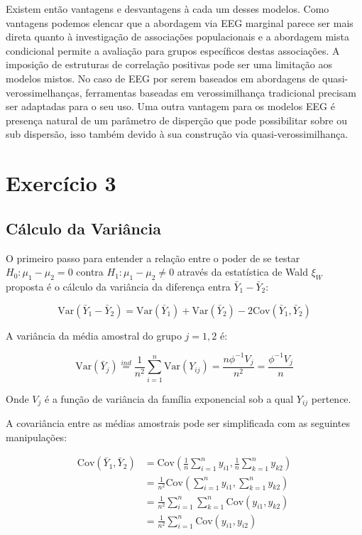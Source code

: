 \documentclass[
  11pt,
]{article}
\begin{document}
Existem então vantagens e desvantagens à cada um desses modelos. Como vantagens podemos elencar que a abordagem via EEG marginal parece ser mais direta quanto à investigação de associações populacionais e a abordagem mista condicional permite a avaliação para grupos específicos destas associações. A imposição de estruturas de correlação positivas pode ser uma limitação aos modelos mistos. No caso de EEG por serem baseados em abordagens de quasi-verossimelhanças, ferramentas baseadas em verossimilhança tradicional precisam ser adaptadas para o seu uso. Uma outra vantagem para os modelos EEG é presença natural de um parâmetro de disperção que pode possibilitar sobre ou sub dispersão, isso também devido à sua construção via quasi-verossimilhança.

\hypertarget{exercuxedcio-3}{%
\section{Exercício 3}\label{exercuxedcio-3}}

\hypertarget{cuxe1lculo-da-variuxe2ncia}{%
\subsection{Cálculo da Variância}\label{cuxe1lculo-da-variuxe2ncia}}

O primeiro passo para entender a relação entre o poder de se testar \(H_0: \mu_1 - \mu_2 = 0\) contra \(H_1: \mu_1 - \mu_2 \ne 0\) através da estatística de Wald \(\xi_W\) proposta é o cálculo da variância da diferença entra \(\bar Y_1 - \bar Y_2\):

\[
\text{Var}(\bar Y_1 - \bar Y_2) =  \text{Var}(\bar Y_1) +  \text{Var}(\bar Y_2) - 2\text{Cov}(\bar Y_1 , \bar Y_2)
\]

A variância da média amostral do grupo \(j=1,2\) é:

\[
\text{Var}(\bar Y_j) \stackrel{ind}{=} \frac{1}{n^2} \sum^{n}_{i=1}{\text{Var}(Y_{ij})} = \frac{n\phi^{-1}V_j}{n^2} = \frac{\phi^{-1}V_j}{n}
\]

Onde \(V_j\) é a função de variância da família exponencial sob a qual \(Y_{ij}\) pertence.

A covariância entre as médias amostrais pode ser simplificada com as seguintes manipulações:

\begin{align*}
\text{Cov}(\bar Y_1 , \bar Y_2) 
&=   \text{Cov} \left( \frac{1}{n} \sum^{n}_{i=1}{y_{i1}} , \frac{1}{n} \sum^{n}_{k=1}{y_{k2}} \right) \\
&=   \frac{1}{n^2} \text{Cov} \left(  \sum^{n}_{i=1}{y_{i1}} , \sum^{n}_{k=1}{y_{k2}} \right) \\
&=   \frac{1}{n^2}  \sum^{n}_{i=1} \sum^{n}_{k=1} \text{Cov} \left(  y_{i1} , y_{k2} \right) \\
&=   \frac{1}{n^2}  \sum^{n}_{i=1} \text{Cov} \left(  y_{i1} , y_{i2} \right) \\
\end{align*}
\end{document}
